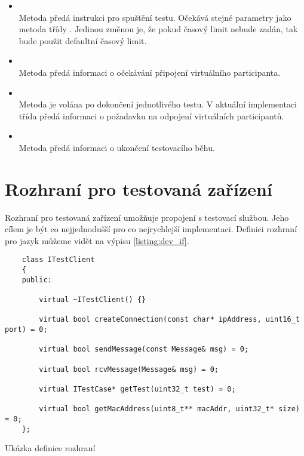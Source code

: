 \begin{itemize}
    \item {} \\ Metoda předá instrukci pro spuštění testu. Očekává stejné parametry jako metoda  třídy . Jedinou změnou je, že pokud časový limit nebude zadán, tak bude použit defaultní časový limit.
    \item {} \\ Metoda předá informaci o očekávání připojení virtuálního participanta.
    \item {} \\ Metoda je volána po dokončení jednotlivého testu. V aktuální implementaci třída předá informaci o požadavku na odpojení virtuálních participantů.
    \item {} \\ Metoda předá informaci o ukončení testovacího běhu.
\end{itemize}


\section{Rozhraní pro testovaná zařízení}

Rozhraní pro testovaná zařízení umožňuje propojení s testovací službou. Jeho cílem je být co nejjednodušší pro co nejrychlejší implementaci. Definici rozhraní pro jazyk  můžeme vidět na výpisu \ref{listing:dev_if}.

\begin{listing}[htbp]
    \begin{verbatim}
    class ITestClient
    {
    public:

        virtual ~ITestClient() {}

        virtual bool createConnection(const char* ipAddress, uint16_t port) = 0;

        virtual bool sendMessage(const Message& msg) = 0;

        virtual bool rcvMessage(Message& msg) = 0;

        virtual ITestCase* getTest(uint32_t test) = 0;

        virtual bool getMacAddress(uint8_t** macAddr, uint32_t* size) = 0;
    };
    \end{verbatim}
\caption{Ukázka definice rozhraní}
\label{listing:dev_if}
\end{listing}


